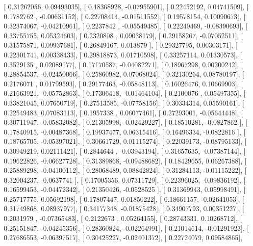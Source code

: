 \documentclass{article}
\begin{document}
       [ 0.31262056,  0.09493035],
       [ 0.18368928, -0.07955901],
       [ 0.22452192,  0.04741509],
       [ 0.1782762 , -0.00631152],
       [ 0.22708414, -0.01511552],
       [ 0.19578154,  0.10090673],
       [ 0.32374067, -0.04210961],
       [ 0.2237842 , -0.05549485],
       [ 0.22249469, -0.08390693],
       [ 0.33755755,  0.05324603],
       [ 0.2320808 ,  0.09038179],
       [ 0.29158267, -0.07052511],
       [ 0.31575871,  0.09937681],
       [ 0.26849167,  0.013879  ],
       [ 0.29327795,  0.00303171],
       [ 0.22301741,  0.00338433],
       [ 0.29818873,  0.01710598],
       [ 0.33257114,  0.01330573],
       [ 0.3529135 ,  0.02089177],
       [ 0.17170587, -0.04082271],
       [ 0.18967298,  0.00200242],
       [ 0.28854537, -0.02450066],
       [ 0.25860982,  0.07068024],
       [ 0.32130264,  0.08780197],
       [ 0.2176071 ,  0.01799593],
       [ 0.29177463, -0.05848113],
       [ 0.16026476,  0.10669903],
       [ 0.21663921, -0.05752863],
       [ 0.17306418, -0.01464104],
       [ 0.2100076 ,  0.05497355],
       [ 0.33821045,  0.07650719],
       [ 0.27513585, -0.07758156],
       [ 0.30334314,  0.05590161],
       [ 0.22549483,  0.07083113],
       [ 0.1957338 ,  0.06077461],
       [ 0.27293001, -0.05644448],
       [ 0.30711947, -0.05832082],
       [ 0.21305998, -0.02429227],
       [ 0.18510281, -0.0827862 ],
       [ 0.17840915, -0.00487368],
       [ 0.19937477,  0.06315416],
       [ 0.16496334, -0.0822816 ],
       [ 0.18765705, -0.05397021],
       [ 0.30661729,  0.01115274],
       [ 0.22039173, -0.08795133],
       [ 0.30949219,  0.02111421],
       [ 0.2844644 , -0.03943194],
       [ 0.31657635, -0.07387144],
       [ 0.19622826, -0.06627728],
       [ 0.31389868, -0.09488682],
       [ 0.18429655,  0.06267388],
       [ 0.25889298, -0.04100112],
       [ 0.28068489,  0.08842824],
       [ 0.31284113, -0.01115222],
       [ 0.32004237, -0.0637741 ],
       [ 0.17005356,  0.07311729],
       [ 0.22396025, -0.09836192],
       [ 0.16599453, -0.04472342],
       [ 0.21350426, -0.0528525 ],
       [ 0.31369943,  0.05998491],
       [ 0.25717775,  0.05692198],
       [ 0.17807447,  0.01850222],
       [ 0.18661157, -0.02641053],
       [ 0.31749868,  0.08937977],
       [ 0.34177348, -0.01875428],
       [ 0.34907793,  0.00351227],
       [ 0.2031979 , -0.07365483],
       [ 0.2122673 ,  0.05264155],
       [ 0.28743331,  0.10268712],
       [ 0.25151847, -0.04245356],
       [ 0.28360824, -0.02264991],
       [ 0.21014614, -0.01291923],
       [ 0.27686553, -0.06397517],
       [ 0.30425227, -0.02401372],
       [ 0.22724079,  0.09584865],
\end{document}
